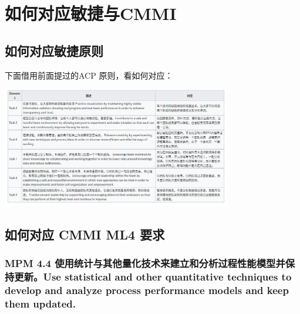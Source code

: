 \chapter{如何对应敏捷与CMMI} %

\hypertarget{ux5982ux4f55ux5bf9ux5e94ux654fux6377ux539fux5219}{%
\section{如何对应敏捷原则}\label{ux5982ux4f55ux5bf9ux5e94ux654fux6377ux539fux5219}}

下面借用前面提过的ACP 原则，看如何对应：

\includegraphics[width=10cm]{Screenshotfrom2022-01-24-1.jpg}

\hypertarget{ux5982ux4f55ux5bf9ux5e94-cmmi-ml4-ux8981ux6c42}{%
\section{如何对应 CMMI ML4
要求}\label{ux5982ux4f55ux5bf9ux5e94-cmmi-ml4-ux8981ux6c42}}

\hypertarget{mpm-4.4-ux4f7fux7528ux7edfux8ba1ux4e0eux5176ux4ed6ux91cfux5316ux6280ux672fux6765ux5efaux7acbux548cux5206ux6790ux8fc7ux7a0bux6027ux80fdux6a21ux578bux5e76ux4fddux6301ux66f4ux65b0use-statistical-and-other-quantitative-techniques-to-develop-and-analyze-process-performance-models-and-keep-them-updated.}{%
\subsection{MPM 4.4
使用统计与其他量化技术来建立和分析过程性能模型并保持更新。Use
statistical and other quantitative techniques to develop and analyze
process performance models and keep them
updated.}\label{mpm-4.4-ux4f7fux7528ux7edfux8ba1ux4e0eux5176ux4ed6ux91cfux5316ux6280ux672fux6765ux5efaux7acbux548cux5206ux6790ux8fc7ux7a0bux6027ux80fdux6a21ux578bux5e76ux4fddux6301ux66f4ux65b0use-statistical-and-other-quantitative-techniques-to-develop-and-analyze-process-performance-models-and-keep-them-updated.}}

